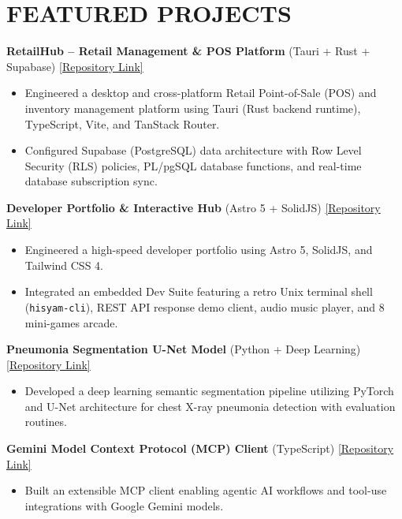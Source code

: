\documentclass[10pt,a4paper]{article}
\begin{document}
\section{FEATURED PROJECTS}

\textbf{RetailHub -- Retail Management \& POS Platform} (Tauri + Rust + Supabase) \hfill \href{https://github.com/caleheinzz25/retailhub}{[Repository Link]}
\begin{itemize}
    \item Engineered a desktop and cross-platform Retail Point-of-Sale (POS) and inventory management platform using Tauri (Rust backend runtime), TypeScript, Vite, and TanStack Router.
    \item Configured Supabase (PostgreSQL) data architecture with Row Level Security (RLS) policies, PL/pgSQL database functions, and real-time database subscription sync.
\end{itemize}

\vspace{3pt}

\textbf{Developer Portfolio \& Interactive Hub} (Astro 5 + SolidJS) \hfill \href{https://github.com/caleheinzz25/portofolio-2}{[Repository Link]}
\begin{itemize}
    \item Engineered a high-speed developer portfolio using Astro 5, SolidJS, and Tailwind CSS 4.
    \item Integrated an embedded Dev Suite featuring a retro Unix terminal shell (\texttt{hisyam-cli}), REST API response demo client, audio music player, and 8 mini-games arcade.
\end{itemize}

\vspace{3pt}

\textbf{Pneumonia Segmentation U-Net Model} (Python + Deep Learning) \hfill \href{https://github.com/caleheinzz25/pneumonia-segmentation-unet}{[Repository Link]}
\begin{itemize}
    \item Developed a deep learning semantic segmentation pipeline utilizing PyTorch and U-Net architecture for chest X-ray pneumonia detection with evaluation routines.
\end{itemize}

\vspace{3pt}

\textbf{Gemini Model Context Protocol (MCP) Client} (TypeScript) \hfill \href{https://github.com/caleheinzz25/mcp-client-gemini}{[Repository Link]}
\begin{itemize}
    \item Built an extensible MCP client enabling agentic AI workflows and tool-use integrations with Google Gemini models.
\end{itemize}
\end{document}
